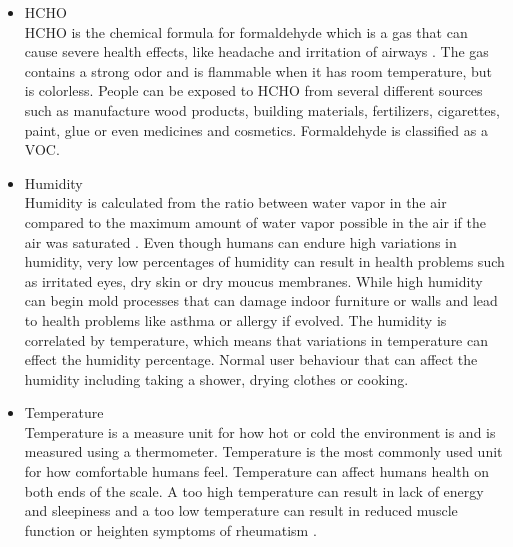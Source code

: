 \begin{itemize}
     \item HCHO\\
        HCHO is the chemical formula for formaldehyde which is a gas that can cause severe health effects, like headache and irritation of airways \cite{HCHO}. The gas contains a strong odor and is flammable when it has room temperature, but is colorless. People can be exposed to HCHO from several different sources such as manufacture wood products, building materials, fertilizers, cigarettes, paint, glue or even medicines and cosmetics. Formaldehyde is classified as a VOC.\\
    \item Humidity\\
        Humidity is calculated from the ratio between water vapor in the air compared to the maximum amount of water vapor possible in the air if the air was saturated \cite{RecommendedIAQ}. Even though humans can endure high variations in humidity, very low percentages of humidity can result in health problems such as irritated eyes, dry skin or dry moucus membranes. While high humidity can begin mold processes that can damage indoor furniture or walls and lead to health problems like asthma or allergy if evolved. The humidity is correlated by temperature, which means that variations in temperature can effect the humidity percentage. Normal user behaviour that can affect the humidity including taking a shower, drying clothes or cooking. \\
    \item Temperature\\
        Temperature is a measure unit for how hot or cold the environment is and is measured using a thermometer. Temperature is the most commonly used unit for how comfortable humans feel. Temperature can affect humans health on both ends of the scale. A too high temperature can result in lack of energy and sleepiness and a too low temperature can result in reduced muscle function or heighten symptoms of rheumatism \cite{Temp}.\\
\end{itemize}

